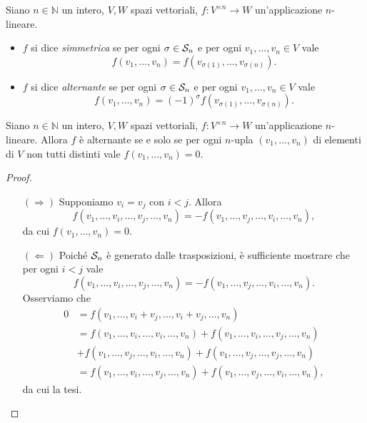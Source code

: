 \begin{definition}
Siano $n\in\mathbb{N}$ un intero, $V\comma W$ spazi vettoriali, $f:V^{\times n}\to W$ un'applicazione $n$-lineare.
\begin{itemize}
\item $f$ si dice \emph{simmetrica} se per ogni $\sigma\in \mathcal{S}_n$ e per ogni $v_1,\ldots,v_n\in V$ vale
$$
f(v_1,\ldots,v_n)=f(v_{\sigma(1)},\ldots,v_{\sigma(n)}).
$$
\item $f$ si dice \emph{alternante} se per ogni $\sigma\in \mathcal{S}_n$ e per ogni $v_1,\ldots,v_n\in V$ vale
$$
f(v_1,\ldots,v_n)=(-1)^\sigma f(v_{\sigma(1)},\ldots,v_{\sigma(n)}).
$$
\end{itemize}
\end{definition}

\begin{proposition}
Siano $n\in\mathbb{N}$ un intero, $V\comma W$ spazi vettoriali, $f:V^{\times n}\to W$ un'applicazione $n$-lineare. Allora $f$ è alternante se e solo se per ogni $n$-upla $(v_1,\ldots,v_n)$ di elementi di $V$ non tutti distinti vale $f(v_1,\ldots,v_n)=0$.
\end{proposition}
\begin{proof}
\leavevmode
\begin{itemize}
\item[$(\Rightarrow)$] Supponiamo $v_i=v_j$ con $i<j$. Allora
$$
f(v_1,\ldots,v_i,\ldots,v_j,\ldots,v_n)=-f(v_1,\ldots,v_j,\ldots,v_i,\ldots,v_n),
$$
da cui $f(v_1,\ldots,v_n)=0$.
\item[$(\Leftarrow)$] Poiché $\mathcal{S}_n$ è generato dalle trasposizioni, è sufficiente mostrare che per ogni $i<j$ vale
$$
f(v_1,\ldots,v_i,\ldots,v_j,\ldots,v_n)=-f(v_1,\ldots,v_j,\ldots,v_i,\ldots,v_n).
$$
Osserviamo che
\begin{align*}
0&=f(v_1,\ldots,v_i+v_j,\ldots,v_i+v_j,\ldots,v_n)\\
&=f(v_1,\ldots,v_i,\ldots,v_i,\ldots,v_n)+f(v_1,\ldots,v_i,\ldots,v_j,\ldots,v_n)\\
&+f(v_1,\ldots,v_j,\ldots,v_i,\ldots,v_n)+f(v_1,\ldots,v_j,\ldots,v_j,\ldots,v_n)\\
&=f(v_1,\ldots,v_i,\ldots,v_j,\ldots,v_n)+f(v_1,\ldots,v_j,\ldots,v_i,\ldots,v_n),
\end{align*}
da cui la tesi.
\end{itemize}
\end{proof}


